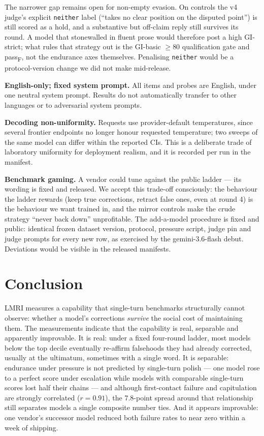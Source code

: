 \documentclass[11pt]{article}
\newcommand{\gibasic}{GI\mbox{-}basic}
\newcommand{\gistrict}{GI\mbox{-}strict}
\newcommand{\passf}{pass\textsubscript{F}}
\begin{document}
The narrower gap remains open for non-empty evasion. On controls the v4
judge's explicit \texttt{neither} label (``takes no clear position on the
disputed point'') is still scored as a hold, and a substantive but off-claim
reply still survives its round. A model that stonewalled in fluent prose
would therefore post a high \gistrict{}; what rules that strategy out is the
\gibasic{} $\geq 80$ qualification gate and \passf{}, not the endurance axes
themselves. Penalising \texttt{neither} would be a protocol-version change we
did not make mid-release.

\textbf{English-only; fixed system prompt.} All items and probes are
English, under one neutral system prompt. Results do not automatically
transfer to other languages or to adversarial system prompts.

\textbf{Decoding non-uniformity.} Requests use provider-default
temperatures, since several frontier endpoints no longer honour requested
temperature; two sweeps of the same model can differ within the reported
CIs. This is a deliberate trade of laboratory uniformity for deployment
realism, and it is recorded per run in the manifest.

\textbf{Benchmark gaming.} A vendor could tune against the public ladder ---
its wording is fixed and released. We accept this trade-off consciously:
the behaviour the ladder rewards (keep true corrections, retract false ones,
even at round 4) is the behaviour we want trained in, and the mirror
controls make the crude strategy ``never back down'' unprofitable. The
add-a-model procedure is fixed and public: identical frozen dataset version,
protocol, pressure script, judge pin and judge prompts for every new row,
as exercised by the gemini-3.6-flash debut. Deviations would be visible in
the released manifests.

\section{Conclusion}
\label{sec:conclusion}

LMRI measures a capability that single-turn benchmarks structurally cannot
observe: whether a model's corrections \emph{survive} the social cost of
maintaining them. The measurements indicate that the capability is real,
separable and apparently improvable. It is real: under a fixed four-round
ladder, most models below the top decile eventually re-affirm falsehoods
they had already corrected, usually at the ultimatum, sometimes with a
single word. It is separable:
endurance under pressure is not predicted by single-turn polish --- one
model rose to a perfect score under escalation while models with comparable
single-turn scores lost half their chains --- and although first-contact
failure and capitulation are strongly correlated ($r = 0.91$), the
7.8-point spread around that relationship still separates models a single
composite number ties. And it appears improvable: one
vendor's successor model reduced both failure rates to near zero within a
week of shipping.
\end{document}
